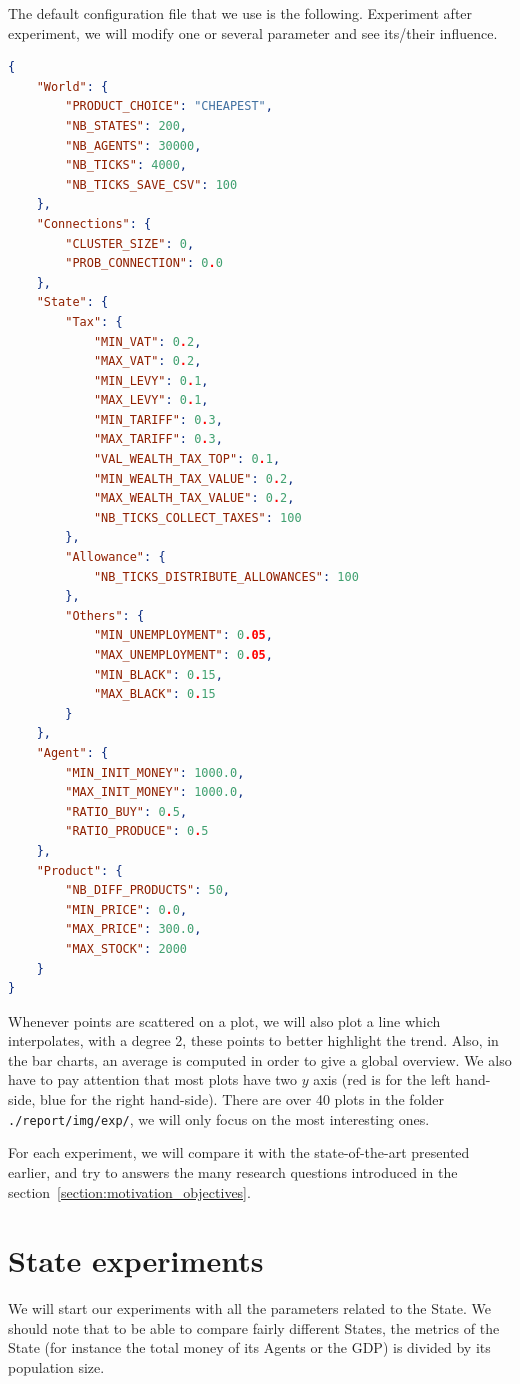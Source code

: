 The default configuration file that we use is the following. Experiment after experiment, we will modify one or several parameter and see its/their influence. 

\begin{lstlisting}[language=json,firstnumber=1]
{
    "World": {
        "PRODUCT_CHOICE": "CHEAPEST",
        "NB_STATES": 200,
        "NB_AGENTS": 30000,
        "NB_TICKS": 4000,
        "NB_TICKS_SAVE_CSV": 100
    },
    "Connections": {
        "CLUSTER_SIZE": 0,
        "PROB_CONNECTION": 0.0
    },
    "State": {
        "Tax": {
            "MIN_VAT": 0.2,
            "MAX_VAT": 0.2,
            "MIN_LEVY": 0.1,
            "MAX_LEVY": 0.1,
            "MIN_TARIFF": 0.3,
            "MAX_TARIFF": 0.3,
            "VAL_WEALTH_TAX_TOP": 0.1,
            "MIN_WEALTH_TAX_VALUE": 0.2,
            "MAX_WEALTH_TAX_VALUE": 0.2,
            "NB_TICKS_COLLECT_TAXES": 100
        },
        "Allowance": {
            "NB_TICKS_DISTRIBUTE_ALLOWANCES": 100
        },
        "Others": {
            "MIN_UNEMPLOYMENT": 0.05,
            "MAX_UNEMPLOYMENT": 0.05,
            "MIN_BLACK": 0.15,
            "MAX_BLACK": 0.15
        }
    },
    "Agent": {
        "MIN_INIT_MONEY": 1000.0,
        "MAX_INIT_MONEY": 1000.0,
        "RATIO_BUY": 0.5,
        "RATIO_PRODUCE": 0.5
    },
    "Product": {
        "NB_DIFF_PRODUCTS": 50,
        "MIN_PRICE": 0.0,
        "MAX_PRICE": 300.0,
        "MAX_STOCK": 2000
    }
}
\end{lstlisting}

Whenever points are scattered on a plot, we will also plot a line which interpolates, with a degree 2, these points to better highlight the trend. Also, in the bar charts, an average is computed in order to give a global overview. We also have to pay attention that most plots have two $y$ axis (red is for the left hand-side, blue for the right hand-side). There are over 40 plots in the folder \texttt{./report/img/exp/}, we will only focus on the most interesting ones.

For each experiment, we will compare it with the state-of-the-art presented earlier, and try to answers the many research questions introduced in the section~\ref{section:motivation_objectives}.


\section{State experiments}

We will start our experiments with all the parameters related to the State. We should note that to be able to compare fairly different States, the metrics of the State (for instance the total money of its Agents or the GDP) is divided by its population size. 

